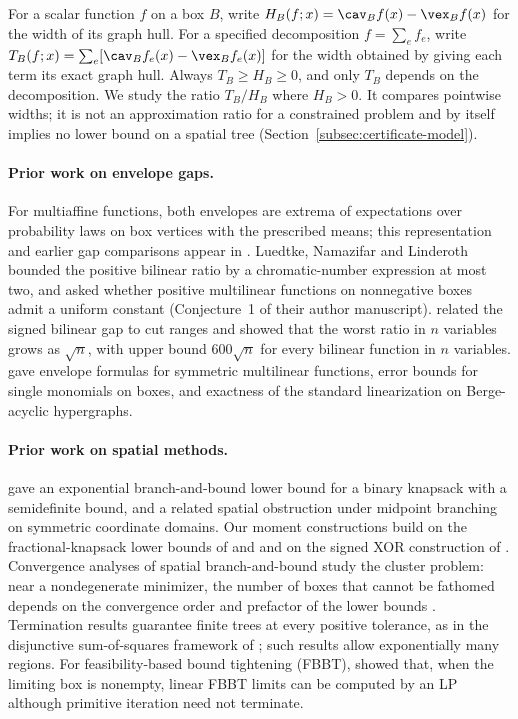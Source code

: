 \documentclass[11pt]{article}
\begin{document}
For a scalar function $f$ on a box $B$, write
$H_B(f;x)=\cav_B f(x)-\vex_B f(x)$ for the width of its graph hull. For a
specified decomposition $f=\sum_e f_e$, write
$T_B(f;x)=\sum_e[\cav_B f_e(x)-\vex_B f_e(x)]$ for the width obtained by
giving each term its exact graph hull. Always $T_B\ge H_B\ge0$, and only
$T_B$ depends on the decomposition. We study the ratio $T_B/H_B$ where
$H_B>0$. It compares pointwise widths; it is not an approximation ratio for
a constrained problem and by itself implies no lower bound on a spatial
tree (Section~\ref{subsec:certificate-model}).

\paragraph{Prior work on envelope gaps.}
For multiaffine functions, both envelopes are extrema of expectations over
probability laws on box vertices with the prescribed means; this
representation and earlier gap comparisons appear in \citet{Luedtke2012}.
Luedtke, Namazifar and Linderoth bounded the positive bilinear ratio by a
chromatic-number expression at most two, and asked whether positive
multilinear functions on nonnegative boxes admit a uniform constant
(Conjecture~1 of their author manuscript). \citet{Boland2017} related the
signed bilinear gap to cut ranges and showed that the worst ratio in $n$
variables grows as $\sqrt n$, with upper bound $600\sqrt n$ for every
bilinear function in $n$ variables. \citet{Sherali1997} gave envelope
formulas for symmetric multilinear functions, \citet{AdamsGupteXu2019}
error bounds for single monomials on boxes, and
\citet{DelPiaKhajavirad2018} exactness of the standard linearization on
Berge-acyclic hypergraphs.

\paragraph{Prior work on spatial methods.}
\citet{Jarre2018} gave an exponential branch-and-bound lower bound for a
binary knapsack with a semidefinite bound, and \citet{Coniglio2026} a
related spatial obstruction under midpoint branching on symmetric
coordinate domains. Our moment constructions build on the
fractional-knapsack lower bounds of \citet{Grigoriev2001} and
\citet{Potechin2019} and on the signed XOR construction of
\citet{Schoenebeck2008}. Convergence analyses of spatial branch-and-bound
study the cluster problem: near a nondegenerate minimizer, the number of
boxes that cannot be fathomed depends on the convergence order and
prefactor of the lower bounds
\citep{DuKearfott1994,WechsungEtAl2014,KannanBarton2017}. Termination
results guarantee finite trees at every positive tolerance, as in the
disjunctive sum-of-squares framework of \citet{AhmadiEtAl2026}; such
results allow exponentially many regions. For feasibility-based bound
tightening (FBBT), \citet{BelottiEtAl2012} showed that, when the limiting
box is nonempty, linear FBBT limits can be computed by an LP although
primitive iteration need not terminate.
\end{document}
